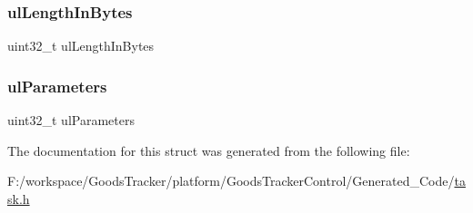 \subsubsection{\texorpdfstring{ul\+Length\+In\+Bytes}{ulLengthInBytes}}
{\footnotesize\ttfamily uint32\+\_\+t ul\+Length\+In\+Bytes}

\mbox{\label{structx_m_e_m_o_r_y___r_e_g_i_o_n_a8339f23aad15c6b829547a17f839f32c}} 
\subsubsection{\texorpdfstring{ul\+Parameters}{ulParameters}}
{\footnotesize\ttfamily uint32\+\_\+t ul\+Parameters}



The documentation for this struct was generated from the following file\+:\begin{DoxyCompactItemize}
\item 
F\+:/workspace/\+Goods\+Tracker/platform/\+Goods\+Tracker\+Control/\+Generated\+\_\+\+Code/\hyperlink{task_8h}{task.\+h}\end{DoxyCompactItemize}
